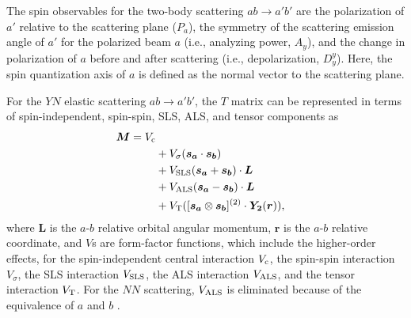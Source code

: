 The spin observables for the two-body scattering $ab\to a'b'$ are the polarization of $a'$ relative to the scattering plane ($P_a$), the symmetry of the scattering emission angle of $a'$ for the polarized beam $a$ (i.e., analyzing power, $A_y$), and the change in polarization of $a$ before and after scattering (i.e., depolarization, $D^y_y$). Here, the spin quantization axis of $a$ is defined as the normal vector to the scattering plane. 

\begin{comment}
Several models describe the $YN$ interaction. For example, there are 
\begin{itemize}
  \item {\bf Extended-Soft Core model (ESC16)} describes the short-range repulsion derived from the quark-Pauli effect phenomenologically using Pomeron exchange, etc.
  \item {\bf Quark-cluster model (QCM)} is a theory of interquark interactions to describe the repulsion.
  \item {\bf Chiral EFT} has the potential to be composed of meson exchange and contact interactions (parameterized by low-energy constants (LECs), the values of which need to be determined by fitting the scattering data) with the contribution of pseudoscalar octuplets. 
\end{itemize}
Compared to the abundance of $NN$ scattering data, $YN$ scattering data are still scarce. A robust model dependence appears in the amount of spin observed in SU(3)$_f$ space with the introduction of $s$ quarks in the model above. We plan to constrain these models by experimentally measuring the $ \Lp$ spin observables.
\end{comment}

For the $YN$ elastic scattering $ab\to a'b'$, the $T$ matrix can be represented in terms of spin-independent, spin-spin, SLS, ALS, and tensor components as
\begin{align}
  \bm{M} = V_{\rm c} \\
  &+ V_{\sigma}(\bm{s_a} \cdot \bm{s_b}) \\
  &+ V_{{\rm SLS}}(\bm{s_a} + \bm{s_b}) \cdot \bm{L} \\
  &+ V_{{\rm ALS}}(\bm{s_a} - \bm{s_b}) \cdot \bm{L} \\
  &+V_{{\rm T}}([\bm{s_a} \otimes \bm{s_b}]^{(2)} \cdot \bm{Y_2}(\bm{r})),
\end{align}
where $\bm{L}$ is the $a$-$b$ relative orbital angular momentum, $\bm{r}$ is the $a$-$b$ relative coordinate, and $V$s are form-factor functions, which include the higher-order effects, for the spin-independent central interaction $V_{\rm c}$, the spin-spin interaction $V_{\sigma}$, the SLS interaction $V_{\rm SLS}$, the ALS interaction $V_{\rm ALS}$, and the tensor interaction $V_{\rm T}$. %
For the $NN$ scattering, $V_{\rm ALS}$ is eliminated because of the equivalence of $a$ and $b$ \cite{Ishikawa-2004}. 

